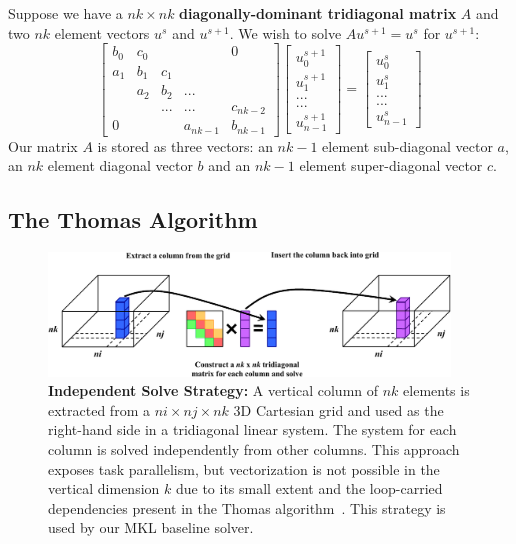 \documentclass[10pt, conference, compsocconf]{IEEEtran}
\begin{document}
Suppose we have a \(nk \times nk\) \textbf{diagonally-dominant tridiagonal matrix} 
  \(A\) and two \(nk\) element vectors \(u^{s}\) and \(u^{s+1}\). 
  We wish to solve \(Au^{s+1} = u^{s}\) for \(u^{s+1}\):
\begin{equation}
\label{eq:tridiag_system}
\begin{bmatrix}
b_0 & c_0 &     &          & 0        \\
a_1 & b_1 & c_1 &          &          \\
    & a_2 & b_2 & ...      &          \\
    &     & ... & ...      & c_{nk-2} \\
0   &     &     & a_{nk-1} & b_{nk-1}
\end{bmatrix}
\begin{bmatrix}
u^{s+1}_0     \\
u^{s+1}_1     \\
...     \\
...     \\
u^{s+1}_{n-1}
\end{bmatrix}
=
\begin{bmatrix}
u^{s}_0     \\
u^{s}_1     \\
...     \\
...     \\
u^{s}_{n-1}
\end{bmatrix}
\end{equation}
Our matrix \(A\) is stored as three vectors: an \(nk-1\) element
  sub-diagonal vector \(a\), an \(nk\) element diagonal vector \(b\) and an
  \(nk-1\) element super-diagonal vector \(c\).

\subsection{The Thomas Algorithm}
\label{sec:impl:thomas_algorithm}

\begin{figure}[!bth]
  \centering
  \caption{\small
      \textbf{Independent Solve Strategy:} A vertical column of \(nk\) elements is
      extracted from a \(ni \times nj \times nk\) 3D Cartesian grid and used as
      the right-hand side in a tridiagonal linear system.
    The system for each column is solved independently from other columns.
    This approach exposes task parallelism, but vectorization is not possible
      in the vertical dimension \(k\) due to its small extent and the loop-carried
      dependencies present in the Thomas
      algorithm~\cite{pipelined_thomas_algorithm}.
    This strategy is used by our MKL baseline solver.
  }
  \label{fig:impl:batching:ind_strat}
  \includegraphics[width=0.95\textwidth]{figures/batching/independent_solve_diagram.pdf}
\end{figure}
\end{document}
